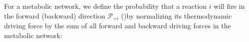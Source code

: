 For a metabolic network, we define the probability that a reaction $i$ will fire in the forward (backward)  direction ${\mathcal P_{+i}}$ ()by normalizing its thermodynamic driving force by the sum of all forward and backward driving forces in the metabolic network: